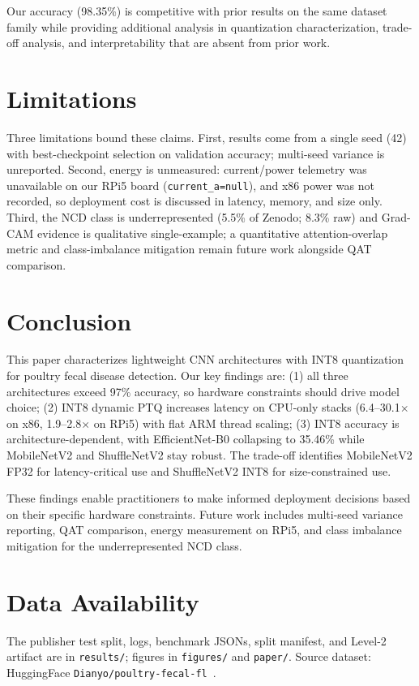 \documentclass[conference,a4paper]{IEEEtran}
\begin{document}
Our accuracy (98.35\%) is competitive with prior results on the same dataset family while providing additional analysis in quantization characterization, trade-off analysis, and interpretability that are absent from prior work.

\section{Limitations}

Three limitations bound these claims. First, results come from a single seed (42) with best-checkpoint selection on validation accuracy; multi-seed variance is unreported. Second, energy is unmeasured: current/power telemetry was unavailable on our RPi5 board (\texttt{current\_a=null}), and x86 power was not recorded, so deployment cost is discussed in latency, memory, and size only. Third, the NCD class is underrepresented (5.5\% of Zenodo; 8.3\% raw) and Grad-CAM evidence is qualitative single-example; a quantitative attention-overlap metric and class-imbalance mitigation remain future work alongside QAT comparison.

\section{Conclusion}

This paper characterizes lightweight CNN architectures with INT8 quantization for poultry fecal disease detection. Our key findings are: (1) all three architectures exceed 97\% accuracy, so hardware constraints should drive model choice; (2) INT8 dynamic PTQ increases latency on CPU-only stacks (6.4--30.1$\times$ on x86, 1.9--2.8$\times$ on RPi5) with flat ARM thread scaling; (3) INT8 accuracy is architecture-dependent, with EfficientNet-B0 collapsing to 35.46\% while MobileNetV2 and ShuffleNetV2 stay robust. The trade-off identifies MobileNetV2 FP32 for latency-critical use and ShuffleNetV2 INT8 for size-constrained use.

These findings enable practitioners to make informed deployment decisions based on their specific hardware constraints. Future work includes multi-seed variance reporting, QAT comparison, energy measurement on RPi5, and class imbalance mitigation for the underrepresented NCD class.

\section*{Data Availability}
The publisher test split, logs, benchmark JSONs, split manifest, and Level-2 artifact are in \texttt{results/}; figures in \texttt{figures/} and \texttt{paper/}. Source dataset: HuggingFace \texttt{Dianyo/poultry-fecal-fl}~\cite{chi2026}.
\end{document}
